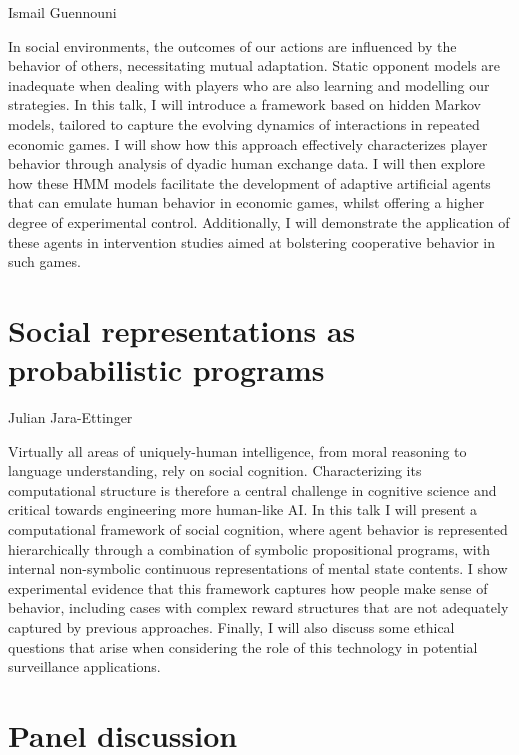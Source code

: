 \documentclass[10pt, letterpaper]{article}
\begin{document}
\begin{center}
Ismail Guennouni
\end{center}

In social environments, the outcomes of our actions are influenced by
the behavior of others, necessitating mutual adaptation. Static opponent
models are inadequate when dealing with players who are also learning
and modelling our strategies. In this talk, I will introduce a framework
based on hidden Markov models, tailored to capture the evolving dynamics
of interactions in repeated economic games. I will show how this
approach effectively characterizes player behavior through analysis of
dyadic human exchange data. I will then explore how these HMM models
facilitate the development of adaptive artificial agents that can
emulate human behavior in economic games, whilst offering a higher
degree of experimental control. Additionally, I will demonstrate the
application of these agents in intervention studies aimed at bolstering
cooperative behavior in such games.

\hypertarget{social-representations-as-probabilistic-programs}{%
\section{Social representations as probabilistic
programs}\label{social-representations-as-probabilistic-programs}}

\begin{center}
Julian Jara-Ettinger
\end{center}

Virtually all areas of uniquely-human intelligence, from moral reasoning
to language understanding, rely on social cognition. Characterizing its
computational structure is therefore a central challenge in cognitive
science and critical towards engineering more human-like AI. In this
talk I will present a computational framework of social cognition, where
agent behavior is represented hierarchically through a combination of
symbolic propositional programs, with internal non-symbolic continuous
representations of mental state contents. I show experimental evidence
that this framework captures how people make sense of behavior,
including cases with complex reward structures that are not adequately
captured by previous approaches. Finally, I will also discuss some
ethical questions that arise when considering the role of this
technology in potential surveillance applications.

\hypertarget{panel-discussion}{%
\section{Panel discussion}\label{panel-discussion}}
\end{document}
